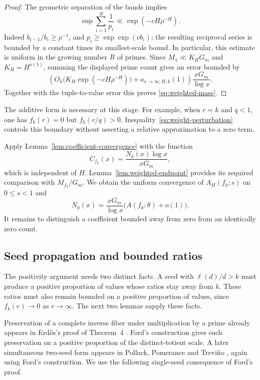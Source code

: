 \begin{proof}
The geometric separation of the bands implies
\[
 \sup\sum_{i=1}^R\frac1{p_i}
       \ll \exp(-cH\rho^{-H}).
\]
Indeed \(b_{i-1}/b_i\geq\rho^{-1}\), and
\(p_i\geq\exp\exp(c b_i)\); the resulting reciprocal series is
bounded by a constant times its smallest-scale bound.  In particular,
this estimate is uniform in the growing number \(R\) of primes.
Since \(M_1\ll K_HG_m\) and \(K_H=H^{o(1)}\), summing the displayed
prime count gives an error bounded by
\[
 \left(O_k\bigl(K_H\exp(-cH\rho^{-H})\bigr)
           +o_{x\to\infty;H,k}(1)\right)\frac{xG_m}{\log x}.
\]
Together with the tuple-to-value error this proves
\eqref{eq:weighted-mass}.
\end{proof}

The additive form is necessary at this stage.  For example, when
\(r=k\) and \(q<1\), one has \(f_k(r)=0\) but \(f_k(r/q)>0\).
Inequality~\eqref{eq:weight-perturbation} controls this boundary without
asserting a relative approximation to a zero term.

Apply Lemma~\ref{lem:coefficient-convergence} with the function
\[
 C_{f_k}(x)=\frac{N_k(x)\log x}{xG_m},
\]
which is independent of \(H\).  Lemma~\ref{lem:weighted-endpoint}
provides its required comparison with \(M_{f_k}/G_m\).  We obtain the
uniform convergence of \(A_H(f_k;s)\) on \(0\leq s<1\) and
\begin{equation}\label{eq:companion-additive}
 N_k(x)=\frac{xG_m}{\log x}
          \bigl(A(f_k;\theta)+o(1)\bigr).
\end{equation}
It remains to distinguish a coefficient bounded away from zero from an
identically zero count.

\subsection{Seed propagation and bounded ratios}
The positivity argument needs two distinct facts.  A seed with
\(\ell(d)/d>k\) must produce a positive proportion of values whose
ratios stay away from \(k\).  These ratios must also remain bounded
on a positive proportion of values, since \(f_k(r)\to0\) as
\(r\to\infty\).  The next two lemmas supply these facts.

Preservation of a complete inverse fiber under multiplication by a prime
already appears in Erd\H{o}s's proof of Theorem~4 \cite{Erdos1958}.
Ford's construction gives such preservation on a positive proportion
of the distinct-totient scale. A later simultaneous two-seed form appears
in Pollack, Pomerance and Trevi\~no \cite[Lemma~4.1]{PPT2013},
again using Ford's construction. We use the following single-seed
consequence of Ford's proof.


